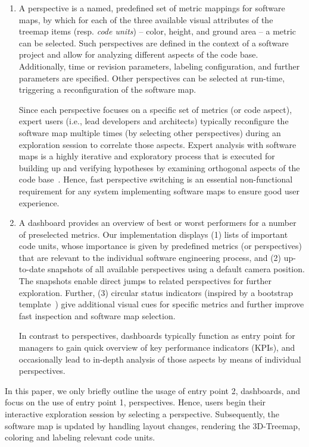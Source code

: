 \documentclass[annual]{acmsiggraph}
\newcommand{\scite}[1]{~\cite{#1}}
\begin{document}
\begin{enumerate}

	\item A perspective is a named, predefined set of metric mappings for software maps, by which for each of the three available visual attributes of the treemap items (resp. \emph{code units}) -- color, height, and ground area -- a metric can be selected.
	Such perspectives are defined in the context of a software project and allow for analyzing different aspects of the code base.
	Additionally, time or revision parameters, labeling configuration, and further parameters are specified.
	Other perspectives can be selected at run-time, triggering a reconfiguration of the software map.

	Since each perspective focuses on a specific set of metrics (or code aspect), expert users (i.e., lead developers and architects) typically reconfigure the software map multiple times (by selecting other perspectives) during an exploration session to correlate those aspects.
	Expert analysis with software maps is a highly iterative and exploratory process that is executed for building up and verifying hypotheses by examining orthogonal aspects of the code base\scite{Truemper2012}.
	Hence, fast perspective switching is an essential non-functional requirement for any system implementing software maps to ensure good user experience.

	\item A dashboard provides an overview of best or worst performers for a number of preselected metrics.
	Our implementation displays (1) lists of important code units, whose importance is given by predefined metrics (or perspectives) that are relevant to the individual software engineering process, and (2) up-to-date snapshots of all available perspectives using a default camera position. The snapshots enable direct jumps to related perspectives for further exploration. Further, (3) circular status indicators (inspired by a bootstrap template\scite{Perfectum2013}) give additional visual cues for specific metrics and further improve fast inspection and software map selection.

	In contrast to perspectives, dashboards typically function as entry point for managers to gain quick overview of key performance indicators (KPIs), and occasionally lead to in-depth analysis of those aspects by means of individual perspectives.

\end{enumerate}

In this paper, we only briefly outline the usage of entry point 2, dashboards, and focus on the use of entry point 1, perspectives.
Hence, users begin their interactive exploration session by selecting a perspective.
Subsequently, the software map is updated by handling layout changes, rendering the 3D-Treemap, coloring and labeling relevant code units.
\end{document}

